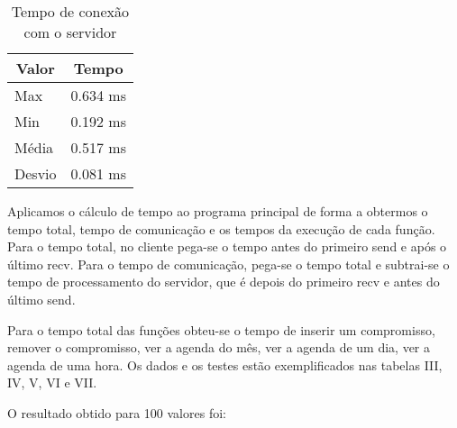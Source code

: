 \documentclass[10pt,a4paper]{article}
\begin{document}
  \begin{table}[h!]
    \begin{center}
        \begin{tabular}{lr}
          \multicolumn{1}{c}{Valor} & \multicolumn{1}{c}{Tempo}\\
          \hline
          Max & 0.634 ms\\
          Min & 0.192 ms\\
          Média & 0.517 ms \\
          Desvio & 0.081 ms
        \end{tabular}
    \end{center}
    \vspace{-5mm}
    \caption{Tempo de conexão com o servidor}        \label{conntime}
  \end{table}

Aplicamos o cálculo de tempo ao programa principal de
  forma a obtermos o tempo total,  tempo de comunicação e os tempos da
  execução de cada função.
  Para o tempo total, no cliente pega-se o tempo antes do primeiro send e após o último recv.
  Para o tempo de comunicação, pega-se o tempo total e subtrai-se o tempo de processamento do servidor,
  que é depois do primeiro recv e antes do último send.

  Para o tempo total das funções obteu-se o tempo de inserir um
  compromisso, remover o compromisso, ver a agenda do mês, ver a agenda
  de um dia, ver a agenda de uma hora. Os dados e os testes estão
  exemplificados nas tabelas III, IV, V, VI e VII.

  O resultado obtido para 100 valores foi:

  \begin{table}[h!]
    \begin{center}

      \hspace{30mm}

    \end{center}
    \vspace{-5mm}
    \caption{Conexão e fechamento de conexão com servidor}
  \end{table}
\end{document}
